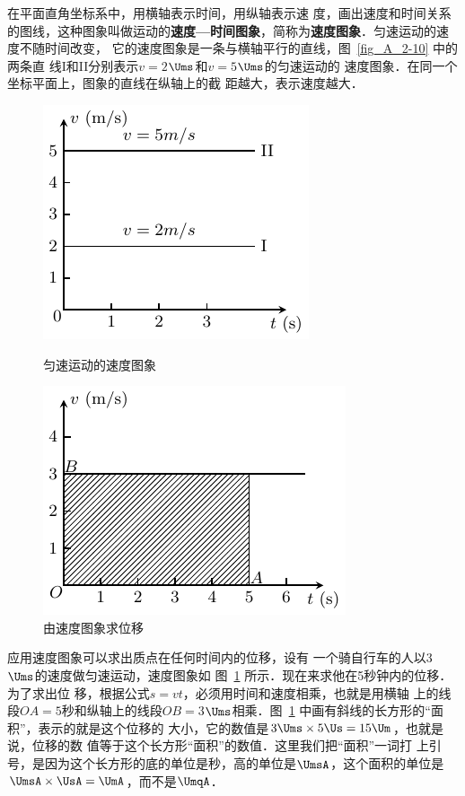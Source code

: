 在平面直角坐标系中，用横轴表示时间，用纵轴表示速
度，画出速度和时间关系的图线，这种图象叫做运动的\textbf{速度—时间图象}，简称为\textbf{速度图象}．匀速运动的速度不随时间改变，
它的速度图象是一条与横轴平行的直线，图~\ref{fig_A_2-10} 中的两条直
线I和II分别表示$v=2$$\Ums$和$v=5$$\Ums$的匀速运动的
速度图象．在同一个坐标平面上，图象的直线在纵轴上的截
距越大，表示速度越大．
\begin{figure}[htp]
    \centering
    \begin{minipage}[t]{0.48\textwidth}
        \centering
        \includegraphics{fig/A/2-10.pdf}
        \caption{匀速运动的速度图象}\label{fig_A_2-10}
    \end{minipage}
    \begin{minipage}[t]{0.48\textwidth}
        \centering
        \includegraphics{fig/A/2-11.pdf}
        \caption{由速度图象求位移}\label{fig_A_2-11}
    \end{minipage}
\end{figure}

应用速度图象可以求出质点在任何时间内的位移，设有
一个骑自行车的人以3$\Ums$的速度做匀速运动，速度图象如
图~\ref{fig_A_2-11} 所示．现在来求他在5秒钟内的位移．为了求出位
移，根据公式$s=vt$，必须用时间和速度相乘，也就是用横轴
上的线段$OA=5$秒和纵轴上的线段$OB=3$$\Ums$相乘．图~\ref{fig_A_2-11} 
中画有斜线的长方形的“面积”，表示的就是这个位移的
大小，它的数值是$3 \Ums \times 5 \Us = 15 \Um$，也就是说，位移的数
值等于这个长方形“面积”的数值．这里我们把“面积”一词打
上引号，是因为这个长方形的底的单位是秒，高的单位是$\UmsA$，这个面积的单位是$\UmsA \times \UsA= \UmA $，而不是$ \UmqA $．

